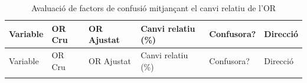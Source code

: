 \documentclass[
]{article}
\begin{document}
\begin{longtable}[]{@{}
  >{\raggedright\arraybackslash}p{}
  >{\centering\arraybackslash}p{}
  >{\centering\arraybackslash}p{}
  >{\centering\arraybackslash}p{}
  >{\centering\arraybackslash}p{}
  >{\raggedright\arraybackslash}p{}@{}}
\caption{Avaluació de factors de confusió mitjançant el canvi relatiu de
l'OR}\tabularnewline
\toprule\noalign{}
\begin{minipage}[b]{\linewidth}\raggedright
Variable
\end{minipage} & \begin{minipage}[b]{\linewidth}\centering
OR Cru
\end{minipage} & \begin{minipage}[b]{\linewidth}\centering
OR Ajustat
\end{minipage} & \begin{minipage}[b]{\linewidth}\centering
Canvi relatiu (\%)
\end{minipage} & \begin{minipage}[b]{\linewidth}\centering
Confusora?
\end{minipage} & \begin{minipage}[b]{\linewidth}\raggedright
Direcció
\end{minipage} \\
\midrule\noalign{}
\endfirsthead
\toprule\noalign{}
\begin{minipage}[b]{\linewidth}\raggedright
Variable
\end{minipage} & \begin{minipage}[b]{\linewidth}\centering
OR Cru
\end{minipage} & \begin{minipage}[b]{\linewidth}\centering
OR Ajustat
\end{minipage} & \begin{minipage}[b]{\linewidth}\centering
Canvi relatiu (\%)
\end{minipage} & \begin{minipage}[b]{\linewidth}\centering
Confusora?
\end{minipage} & \begin{minipage}[b]{\linewidth}\raggedright
Direcció
\end{minipage} \\
\midrule\noalign{}

\end{longtable}
\end{document}
